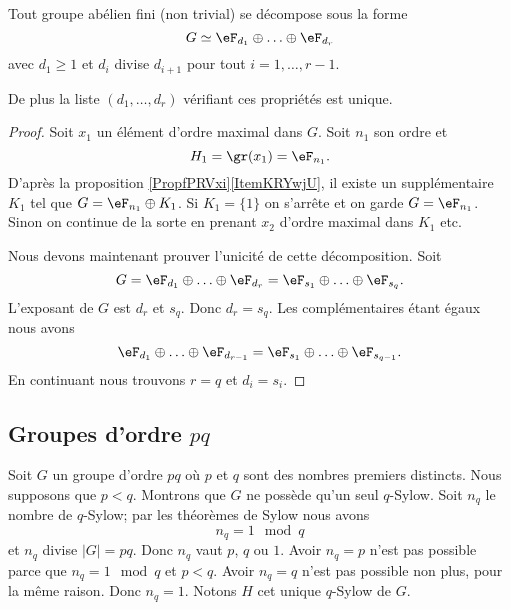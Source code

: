 \begin{theorem}
    Tout groupe abélien fini (non trivial) se décompose sous la forme
    \begin{equation}
        G\simeq \eF_{d_1}\oplus\ldots\oplus \eF_{d_r}
    \end{equation}
    avec \( d_1\geq 1\) et \( d_i\) divise \( d_{i+1}\) pour tout \( i=1,\ldots, r-1\).

    De plus la liste \( (d_1,\ldots, d_r)\) vérifiant ces propriétés est unique.
\end{theorem}

\begin{proof}
    Soit \( x_1\) un élément d'ordre maximal dans \( G\). Soit \( n_1\) son ordre et
    \begin{equation}
        H_1=\gr(x_1)=\eF_{n_1}.
    \end{equation}
    D'après la proposition \ref{PropfPRVxi}\ref{ItemKRYwjU}, il existe un supplémentaire \( K_1\) tel que \( G=\eF_{n_1}\oplus K_1\). Si \( K_1=\{ 1 \}\) on s'arrête et on garde \( G=\eF_{n_1}\). Sinon on continue de la sorte en prenant \( x_2\) d'ordre maximal dans \( K_1\) etc.

    Nous devons maintenant prouver l'unicité de cette décomposition. Soit
    \begin{equation}
        G=\eF_{d_1}\oplus\ldots\oplus \eF_{d_r}=\eF_{s_1}\oplus\ldots\oplus \eF_{s_q}.
    \end{equation}
    L'exposant de \( G\) est \( d_r\) et \( s_q\). Donc \( d_r=s_q\). Les complémentaires étant égaux nous avons
    \begin{equation}
        \eF_{d_1}\oplus\ldots\oplus \eF_{d_{r-1}}=\eF_{s_1}\oplus\ldots\oplus \eF_{s_{q-1}}.
    \end{equation}
    En continuant nous trouvons \( r=q\) et \( d_i=s_i\).
\end{proof}
 
\subsection{Groupes d'ordre $pq$}

Soit \( G\) un groupe d'ordre \( pq\) où \( p\) et \( q\) sont des nombres premiers distincts. Nous supposons que \( p<q\). Montrons que \( G\) ne possède qu'un seul \( q\)-Sylow. Soit \( n_q\) le nombre de \( q\)-Sylow; par les théorèmes de Sylow nous avons
\begin{equation}
    n_q=1\mod q
\end{equation}
et \( n_q\) divise \( | G |=pq\). Donc \( n_q\) vaut \( p\), \( q\) ou \( 1\). Avoir \( n_q=p\) n'est pas possible parce que \( n_q=1\mod q\) et \( p<q\). Avoir \( n_q=q\) n'est pas possible non plus, pour la même raison. Donc \( n_q=1\). Notons \( H\) cet unique \( q\)-Sylow de \( G\).


